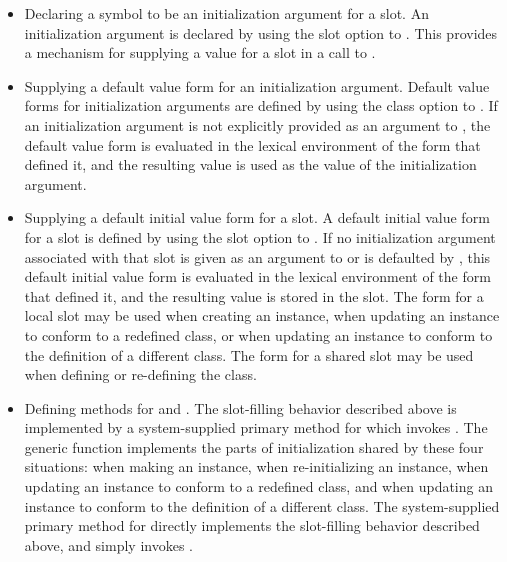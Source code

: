 \begin{itemize}

\item  Declaring a symbol to be an initialization argument for a
slot.  An initialization argument is declared by using the 
 slot option to .  This provides a mechanism
for supplying a value for a slot in a call to .

\item  Supplying a default value form for an initialization
argument.  Default value forms for initialization arguments are
defined by using the  class option to 
.  If an initialization argument is not explicitly provided
as an argument to , the default value form is
evaluated in the lexical environment of the  form that
defined it, and the resulting value is used as the value of the
initialization argument.

\item  Supplying a default initial value form for a slot.  A
default initial value form for a slot is defined by using the 
 slot option to .  If no initialization
argument associated with that slot is given as an argument to 
 or is defaulted by , this
default initial value form is evaluated in the lexical environment of
the  form that defined it, and the resulting value is
stored in the slot.  The  form for a local slot may be
used when creating an instance, when updating an instance to conform
to a redefined class, or when updating an instance to conform to the
definition of a different class. The  form for a shared
slot may be used when defining or re-defining the class.

\item  Defining methods for  and 
.  The slot-filling behavior described above is
implemented by a system-supplied primary method for 
 which invokes . The
generic function  implements the parts of
initialization shared by these four situations: when making an
instance, when re-initializing an instance, when updating an instance
to conform to a redefined class, and when updating an instance to
conform to the definition of a different class. The system-supplied
primary method for  directly implements the
slot-filling behavior described above, and 
simply invokes .

\end{itemize}

